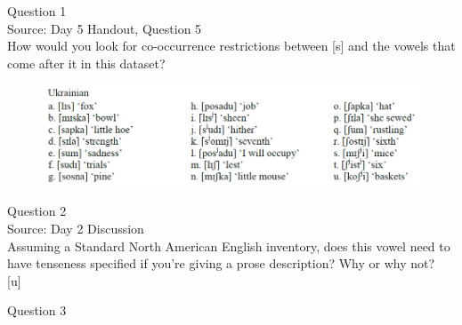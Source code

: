 \documentclass[12pt]{article}
\begin{document}
\begin{center}
\textbf{{\color{violet}{\HUGE Thursday, 4 June 2020\\}}}

\textbf{{\color{violet}{\HUGE ALL EXAMS\\}}}

\end{center}
\newpage

\begin{center}
\textbf{{\color{blue}{\HUGE START OF EXAM\\}}}

\textbf{{\color{blue}{\HUGE Student ID: 4220\\}}}

\textbf{{\color{blue}{\HUGE 11:45 AM - 12:00 noon\\}}}

\end{center}
\newpage

{\large Question 1}\\

Source: Day 5 Handout, Question 5\\

How would you look for co-occurrence restrictions between [s] and the vowels that come after it in this dataset?\\

\begin{figure}[H]
\includegraphics{../images/ukrainian.png}
\end{figure}

\newpage

{\large Question 2}\\

Source: Day 2 Discussion\\

Assuming a Standard North American English inventory, does this vowel need to have tenseness specified if you're giving a prose description? Why or why not?\\

{[u]}


\newpage

{\large Question 3}\\
\end{document}
